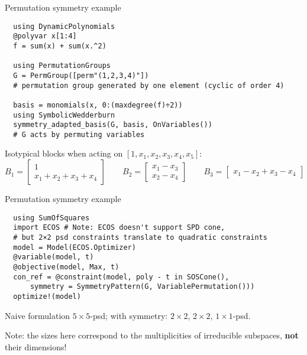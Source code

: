 \begin{frame}[fragile]{Permutation symmetry example}
\footnotesize
\begin{verbatim}
  using DynamicPolynomials
  @polyvar x[1:4]
  f = sum(x) + sum(x.^2)

  using PermutationGroups
  G = PermGroup([perm"(1,2,3,4)"])
  # permutation group generated by one element (cyclic of order 4)

  basis = monomials(x, 0:(maxdegree(f)÷2))
  using SymbolicWedderburn
  symmetry_adapted_basis(G, basis, OnVariables())
  # G acts by permuting variables
\end{verbatim}

Isotypical blocks when acting on $[1, x_1, x_2, x_3, x_4, x_5]$:
\[
  B_1 = \begin{bmatrix}
          1\\
          x_1 + x_2 + x_3 + x_4
        \end{bmatrix}
  \qquad
  B_2 = \begin{bmatrix}
          x_1 - x_3\\
          x_2 - x_4
        \end{bmatrix}
  \qquad
  B_3 = \begin{bmatrix}
          x_1 - x_2 + x_3 - x_4
        \end{bmatrix}
\]
\end{frame}

\begin{frame}[fragile]{Permutation symmetry example}
\footnotesize
\begin{verbatim}
  using SumOfSquares
  import ECOS # Note: ECOS doesn't support SPD cone,
  # but 2×2 psd constraints translate to quadratic constraints
  model = Model(ECOS.Optimizer)
  @variable(model, t)
  @objective(model, Max, t)
  con_ref = @constraint(model, poly - t in SOSCone(), 
      symmetry = SymmetryPattern(G, VariablePermutation())) 
  optimize!(model)
\end{verbatim}

\normalsize

Naive formulation $5\times 5$-psd; with symmetry: $2\times 2$, $2\times 2$, $1\times 1$-psd.

Note: the sizes here correspond to the multiplicities of irreducible subspaces, \textbf{not} their dimensions!

\end{frame}

